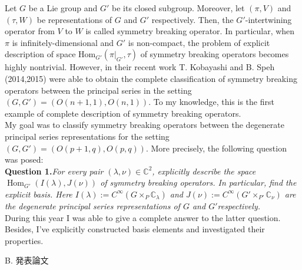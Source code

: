\documentclass[a4j,twocolumn]{jarticle}
\begin{document}
\vspace{0.5cm}
Let $G$ be a Lie group and $G'$ be its closed subgroup. Moreover, let $(\pi,V)$ and $(\tau,W)$ be representations of $G$ and $G'$
respectively. Then, the $G'$-intertwining operator from $V$ to $W$ is called symmetry breaking operator. In particular, when 
$\pi$ is infinitely-dimensional and $G'$ is non-compact, the problem of explicit description of space
$\mbox{Hom}_{G'}(\pi\big|_{G'},\tau)$ of symmetry breaking operators becomes highly nontrivial. However, in their recent work 
T. Kobayashi and B. Speh (2014,2015) were able to obtain the complete classification of symmetry breaking operators between
the principal series in the setting $(G, G') = (O(n+1,1),O(n,1))$. To my knowledge, this is the first example of complete
description of symmetry breaking operators.\\
My goal was to classify symmetry breaking operators between the degenerate principal series representations for the setting
$(G, G') = (O(p+1,q),O(p,q))$. More precisely, the following question was posed:\\
{\noindent}\textbf{Question \textbf{1}.}{\itshape{For every pair $( \lambda, \nu) \in
\mathbb{C}^2$, explicitly describe the space
$\operatorname{Hom}_{G'}(I(\lambda),J(\nu))$ of symmetry breaking operators. In particular, find the explicit basis.
Here $I(\lambda):=C^{\infty}\left(  G\times_P\mathbb{C}_\lambda\right)$
and $J(\nu):=C^{\infty}\left( G'\times_{P'}\mathbb{C}_{\nu} \right)$ are the degenerate principal series representations of $G$ and
$G'$respectively.}}\\
During this year I was able to give a complete answer to the latter question. Besides, I've explicitly constructed basis
elements and investigated their properties.




\vspace{0.2cm}


\noindent
B. 発表論文

\vspace{0.1cm}
\end{document}
